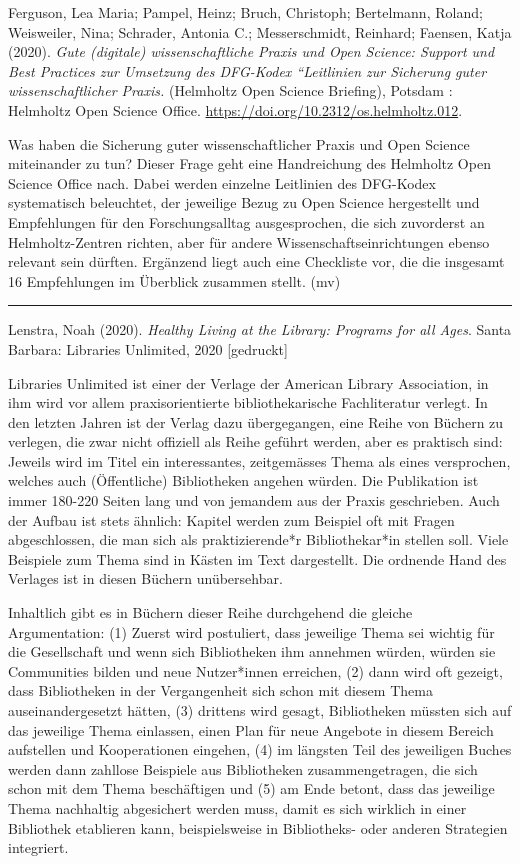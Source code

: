 \documentclass[a4paper,
fontsize=11pt,
oneside,
numbers=noperiodatend,
parskip=half-,
bibliography=totoc,
final
]{scrartcl}
\begin{document}
Ferguson, Lea Maria; Pampel, Heinz; Bruch, Christoph; Bertelmann,
Roland; Weisweiler, Nina; Schrader, Antonia C.; Messerschmidt, Reinhard;
Faensen, Katja (2020). \emph{Gute (digitale) wissenschaftliche Praxis
und Open Science: Support und Best Practices zur Umsetzung des DFG-Kodex
``Leitlinien zur Sicherung guter wissenschaftlicher Praxis.} (Helmholtz
Open Science Briefing), Potsdam : Helmholtz Open Science Office.
\url{https://doi.org/10.2312/os.helmholtz.012}.

Was haben die Sicherung guter wissenschaftlicher Praxis und Open Science
miteinander zu tun? Dieser Frage geht eine Handreichung des Helmholtz
Open Science Office nach. Dabei werden einzelne Leitlinien des DFG-Kodex
systematisch beleuchtet, der jeweilige Bezug zu Open Science hergestellt
und Empfehlungen für den Forschungsalltag ausgesprochen, die sich
zuvorderst an Helmholtz-Zentren richten, aber für andere
Wissenschaftseinrichtungen ebenso relevant sein dürften. Ergänzend liegt
auch eine Checkliste vor, die die insgesamt 16 Empfehlungen im Überblick
zusammen stellt. (mv)

\begin{center}\rule{0.5\linewidth}{0.5pt}\end{center}

Lenstra, Noah (2020). \emph{Healthy Living at the Library: Programs for
all Ages}. Santa Barbara: Libraries Unlimited, 2020 {[}gedruckt{]}

Libraries Unlimited ist einer der Verlage der American Library
Association, in ihm wird vor allem praxisorientierte bibliothekarische
Fachliteratur verlegt. In den letzten Jahren ist der Verlag dazu
übergegangen, eine Reihe von Büchern zu verlegen, die zwar nicht
offiziell als Reihe geführt werden, aber es praktisch sind: Jeweils wird
im Titel ein interessantes, zeitgemässes Thema als eines versprochen,
welches auch (Öffentliche) Bibliotheken angehen würden. Die Publikation
ist immer 180-220 Seiten lang und von jemandem aus der Praxis
geschrieben. Auch der Aufbau ist stets ähnlich: Kapitel werden zum
Beispiel oft mit Fragen abgeschlossen, die man sich als praktizierende*r
Bibliothekar*in stellen soll. Viele Beispiele zum Thema sind in Kästen
im Text dargestellt. Die ordnende Hand des Verlages ist in diesen
Büchern unübersehbar.

Inhaltlich gibt es in Büchern dieser Reihe durchgehend die gleiche
Argumentation: (1) Zuerst wird postuliert, dass jeweilige Thema sei
wichtig für die Gesellschaft und wenn sich Bibliotheken ihm annehmen
würden, würden sie Communities bilden und neue Nutzer*innen erreichen,
(2) dann wird oft gezeigt, dass Bibliotheken in der Vergangenheit sich
schon mit diesem Thema auseinandergesetzt hätten, (3) drittens wird
gesagt, Bibliotheken müssten sich auf das jeweilige Thema einlassen,
einen Plan für neue Angebote in diesem Bereich aufstellen und
Kooperationen eingehen, (4) im längsten Teil des jeweiligen Buches
werden dann zahllose Beispiele aus Bibliotheken zusammengetragen, die
sich schon mit dem Thema beschäftigen und (5) am Ende betont, dass das
jeweilige Thema nachhaltig abgesichert werden muss, damit es sich
wirklich in einer Bibliothek etablieren kann, beispielsweise in
Bibliotheks- oder anderen Strategien integriert.
\end{document}
